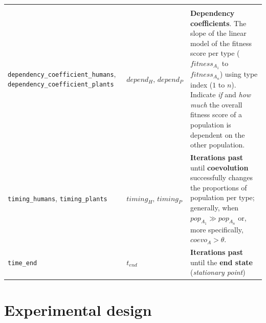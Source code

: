 \documentclass[
]{book}
\begin{document}
\begin{longtable}[]{@{}lll@{}}
\begin{minipage}[t]{0.34\columnwidth}
\end{minipage}\tabularnewline
\begin{minipage}[t]{0.36\columnwidth}\raggedright
\texttt{dependency\_coefficient\_humans}, \texttt{dependency\_coefficient\_plants}\strut
\end{minipage} & \begin{minipage}[t]{0.21\columnwidth}\raggedright
\(depend_{H},\,depend_{P}\)\strut
\end{minipage} & \begin{minipage}[t]{0.34\columnwidth}\raggedright
\textbf{Dependency coefficients}. The slope of the linear model of the fitness score per type (\(fitness_{A_1}\) to \(fitness_{A_n}\)) using type index (\(1\) to \(n\)). Indicate \emph{if} and \emph{how much} the overall fitness score of a population is dependent on the other population.\strut
\end{minipage}\tabularnewline
\begin{minipage}[t]{0.36\columnwidth}\raggedright
\texttt{timing\_humans}, \texttt{timing\_plants}\strut
\end{minipage} & \begin{minipage}[t]{0.21\columnwidth}\raggedright
\(timing_{H},\,timing_{P}\)\strut
\end{minipage} & \begin{minipage}[t]{0.34\columnwidth}\raggedright
\textbf{Iterations past} until \textbf{coevolution} successfully changes the proportions of population per type; generally, when \(pop_{A_1}\gg pop_{A_n}\) or, more specifically, \(coevo_A>\theta\).\strut
\end{minipage}\tabularnewline
\begin{minipage}[t]{0.36\columnwidth}\raggedright
\texttt{time\_end}\strut
\end{minipage} & \begin{minipage}[t]{0.21\columnwidth}\raggedright
\(t_{end}\)\strut
\end{minipage} & \begin{minipage}[t]{0.34\columnwidth}\raggedright
\textbf{Iterations past} until the \textbf{end state} (\emph{stationary point})\strut
\end{minipage}\tabularnewline
\bottomrule
\end{longtable}

\newpage

\hypertarget{experimental-design}{%
\section*{Experimental design}\label{experimental-design}}
\end{document}
